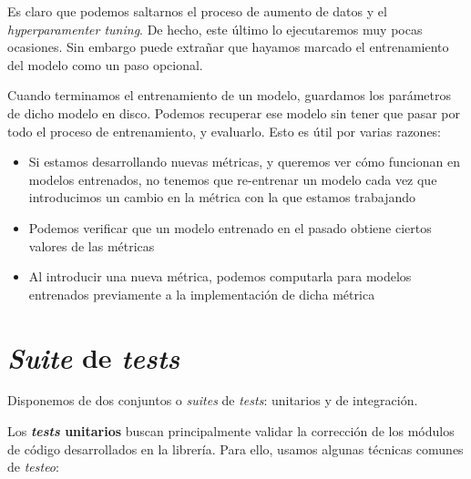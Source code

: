 Es claro que podemos saltarnos el proceso de aumento de datos y el \textit{hyperparamenter tuning}. De hecho, este último lo ejecutaremos muy pocas ocasiones. Sin embargo puede extrañar que hayamos marcado el entrenamiento del modelo como un paso opcional.

Cuando terminamos el entrenamiento de un modelo, guardamos los parámetros de dicho modelo en disco. Podemos recuperar ese modelo sin tener que pasar por todo el proceso de entrenamiento, y evaluarlo. Esto es útil por varias razones:

\begin{itemize}
    \item Si estamos desarrollando nuevas métricas, y queremos ver cómo funcionan en modelos entrenados, no tenemos que re-entrenar un modelo cada vez que introducimos un cambio en la métrica con la que estamos trabajando
    \item Podemos verificar que un modelo entrenado en el pasado obtiene ciertos valores de las métricas
    \item Al introducir una nueva métrica, podemos computarla para modelos entrenados previamente a la implementación de dicha métrica
\end{itemize}

\section{\textit{Suite} de \textit{tests}} \label{isec:test_suite}

Disponemos de dos conjuntos o \textit{suites} de \textit{tests}: unitarios y de integración.

Los \textbf{\textit{tests} unitarios} buscan principalmente validar la corrección de los módulos de código desarrollados en la librería. Para ello, usamos algunas técnicas comunes de \textit{testeo}:

